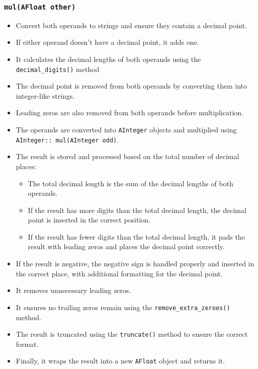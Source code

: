 \documentclass{article}
\begin{document}
\subsubsection*{\texttt{mul(AFloat other)}}
\begin{itemize}
    \item Convert both operands to strings and ensure they contain a decimal point.
    \item If either operand doesn't have a decimal point, it adds one.
    \item It calculates the decimal lengths of both operands using the \texttt{decimal\_digits()} method
    \item The decimal point is removed from both operands by converting them into integer-like strings.
    \item Leading zeros are also removed from both operands before multiplication.
    \item The operands are converted into \texttt{AInteger} objects and multiplied using \texttt{AInteger:: mul(AInteger odd)}.
    \item The result is stored and processed based on the total number of decimal places:
        \begin{itemize}
            \item The total decimal length is the sum of the decimal lengths of both operands.
            \item If the result has more digits than the total decimal length, the decimal point is inserted in the correct position.
            \item If the result has fewer digits than the total decimal length, it pads the result with leading zeros and places the decimal point correctly.
        \end{itemize}
    \item If the result is negative, the negative sign is handled properly and inserted in the correct place, with additional formatting for the decimal point.
    \item It removes unnecessary leading zeros.
    \item It ensures no trailing zeros remain using the \texttt{remove\_extra\_zeroes()} method.
    \item The result is truncated using the \texttt{truncate()} method to ensure the correct format.
    \item Finally, it wraps the result into a new \texttt{AFloat} object and returns it.
\end{itemize}
\end{document}
